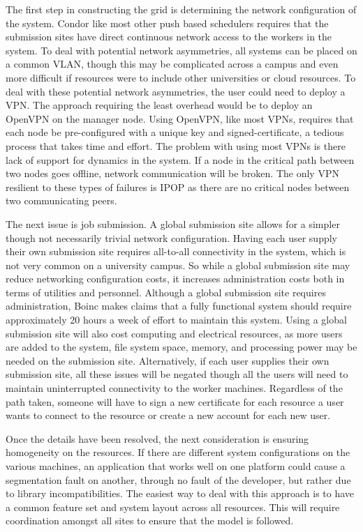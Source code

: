 \documentclass[conference]{IEEEtran}
\begin{document}
The first step in constructing the grid is determining the network
configuration of the system.  Condor like most other push based schedulers
requires that the submission sites have direct continuous network access to the
workers in the system.  To deal with potential network asymmetries, all systems
can be placed on a common VLAN, though this may be complicated across a campus
and even more difficult if resources were to include other universities or
cloud resources.  To deal with these potential network asymmetries, the user
could need to deploy a VPN.  The approach requiring the least overhead would be
to deploy an OpenVPN on the manager node.  Using OpenVPN, like most VPNs,
requires that each node be pre-configured with a unique key and
signed-certificate, a tedious process that takes time and effort.  The problem
with using most VPNs is there lack of support for dynamics in the system.  If a
node in the critical path between two nodes goes offline, network communication
will be broken.  The only VPN resilient to these types of failures is IPOP as
there are no critical nodes between two communicating peers.

The next issue is job submission.  A global submission site allows for a
simpler though not necessarily trivial network configuration.  Having each user
supply their own submission site requires all-to-all connectivity in the
system, which is not very common on a university campus.  So while a global
submission site may reduce networking configuration costs, it increases
administration costs both in terms of utilities and personnel.  Although a
global submission site requires administration, Boinc makes claims that a fully
functional system should require approximately 20 hours a week of effort to
maintain this system.  Using a global submission site will also cost computing
and electrical resources, as more users are added to the system, file system
space, memory, and processing power may be needed on the submission site.
Alternatively, if each user supplies their own submission site, all these
issues will be negated though all the users will need to maintain uninterrupted
connectivity to the worker machines.  Regardless of the path taken, someone
will have to sign a new certificate for each resource a user wants to connect
to the resource or create a new account for each new user.

Once the details have been resolved, the next consideration is ensuring
homogeneity on the resources.  If there are different system configurations on
the various machines, an application that works well on one platform could
cause a segmentation fault on another, through no fault of the developer, but
rather due to library incompatibilities.  The easiest way to deal with this
approach is to have a common feature set and system layout across all
resources.  This will require coordination amongst all sites to ensure that the
model is followed.
\end{document}
